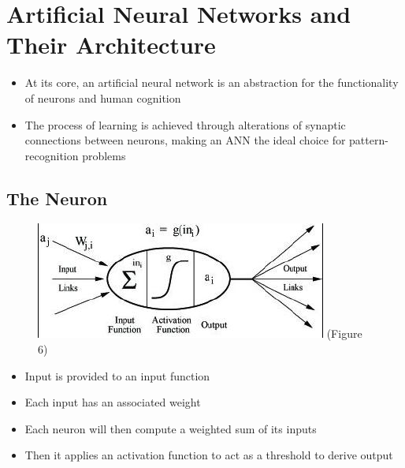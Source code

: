 \documentclass[8pt]{beamer}
\begin{document}
\section{Artificial Neural Networks and Their Architecture}
\begin{frame}
\begin{itemize}

\item At its core, an artificial neural network is an abstraction for the functionality of neurons and human cognition
\item The process of learning is achieved through alterations of synaptic connections between neurons, making an ANN the ideal choice for pattern-recognition problems
\end{itemize}
\end{frame}

\subsection{The Neuron}

\begin{frame}

\begin{figure}

	\center \includegraphics[scale=.8]{neuron_image.jpg}
	\center \tiny(Figure 6)

\end{figure}

\end{frame}

\begin{frame}

\begin{itemize}
\item Input is provided to an input function
\item Each input has an associated weight
\item Each neuron will then compute a weighted sum of its inputs 
\item Then it applies an activation function to act as a threshold to derive output
\end{itemize}

\end{frame}
\end{document}
